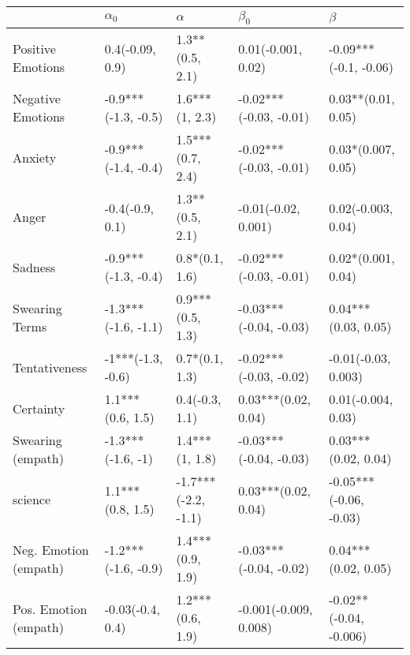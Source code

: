 \begin{tabular}{lllll}
\toprule
{} &           $\alpha_0$ &             $\alpha$ &               $\beta_0$ &                 $\beta$ \\
\midrule
Positive Emotions     &      0.4(-0.09, 0.9) &      1.3**(0.5, 2.1) &      0.01(-0.001, 0.02) &   -0.09***(-0.1, -0.06) \\
Negative Emotions     &  -0.9***(-1.3, -0.5) &       1.6***(1, 2.3) &  -0.02***(-0.03, -0.01) &      0.03**(0.01, 0.05) \\
Anxiety               &  -0.9***(-1.4, -0.4) &     1.5***(0.7, 2.4) &  -0.02***(-0.03, -0.01) &      0.03*(0.007, 0.05) \\
Anger                 &      -0.4(-0.9, 0.1) &      1.3**(0.5, 2.1) &     -0.01(-0.02, 0.001) &      0.02(-0.003, 0.04) \\
Sadness               &  -0.9***(-1.3, -0.4) &       0.8*(0.1, 1.6) &  -0.02***(-0.03, -0.01) &      0.02*(0.001, 0.04) \\
Swearing Terms        &  -1.3***(-1.6, -1.1) &     0.9***(0.5, 1.3) &  -0.03***(-0.04, -0.03) &     0.04***(0.03, 0.05) \\
Tentativeness         &    -1***(-1.3, -0.6) &       0.7*(0.1, 1.3) &  -0.02***(-0.03, -0.02) &     -0.01(-0.03, 0.003) \\
Certainty             &     1.1***(0.6, 1.5) &       0.4(-0.3, 1.1) &     0.03***(0.02, 0.04) &      0.01(-0.004, 0.03) \\
Swearing (empath)     &    -1.3***(-1.6, -1) &       1.4***(1, 1.8) &  -0.03***(-0.04, -0.03) &     0.03***(0.02, 0.04) \\
science               &     1.1***(0.8, 1.5) &  -1.7***(-2.2, -1.1) &     0.03***(0.02, 0.04) &  -0.05***(-0.06, -0.03) \\
Neg. Emotion (empath) &  -1.2***(-1.6, -0.9) &     1.4***(0.9, 1.9) &  -0.03***(-0.04, -0.02) &     0.04***(0.02, 0.05) \\
Pos. Emotion (empath) &     -0.03(-0.4, 0.4) &     1.2***(0.6, 1.9) &   -0.001(-0.009, 0.008) &  -0.02**(-0.04, -0.006) \\
\bottomrule
\end{tabular}
